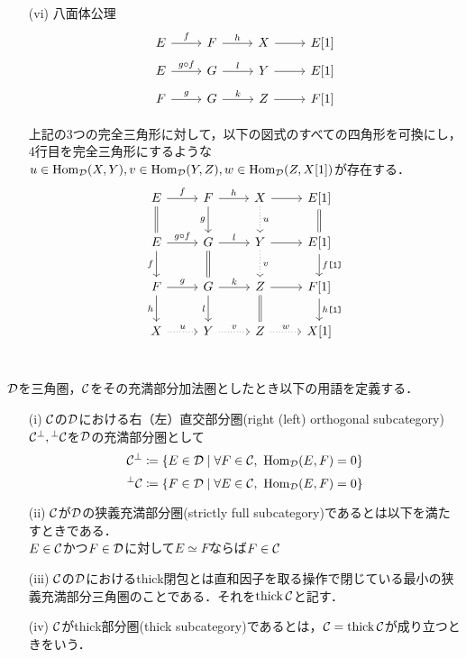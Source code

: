 \begin{defn}
\begin{itemize}
	\item[(vi)]
		八面体公理\\
			\[
				\begin{tikzcd}[row sep=5pt]
			E \ar[r,"f"]& F\ar[r,"h"]& X \ar[r]& E[1]\\
			E \ar[r,"g\circ f"]& G\ar[r,"l"]& Y \ar[r]& E[1]\\
			F \ar[r,"g"]& G\ar[r,"k"]& Z \ar[r]& F[1]\\
		\end{tikzcd}
			\]
			上記の3つの完全三角形に対して，以下の図式のすべての四角形を可換にし，4行目を完全三角形にするような$u\in\operatorname{\mathrm{Hom}}_{{\mathcal D}}(X,Y),v\in\operatorname{\mathrm{Hom}}_{{\mathcal D}}(Y,Z),w\in\operatorname{\mathrm{Hom}}_{{\mathcal D}}(Z,X[1])$が存在する．
			\[
		\begin{tikzcd}
			E \ar[r,"f"]\ar[d,equal]& F\ar[r,"h"]\ar[d,"g",swap]& X\ar[d,"u",dotted] \ar[r]& E[1]\ar[d,equal]\\
			E \ar[r,"g\circ f"]\ar[d,"f",swap]& G\ar[r,"l"]\ar[d,equal]& Y\ar[d,"v",dotted] \ar[r]& E[1]\ar[d,"f\texttt{[1]}"]\\
			F \ar[r,"g"]\ar[d,"h",swap]& G\ar[r,"k"]\ar[d,"l",swap]& Z \ar[r]\ar[d,equal]& F[1]\ar[d,"h\texttt{[1]}"]\\
			X \ar[r,"u",dotted]& Y\ar[r,"v",dotted]& Z \ar[r,"w",dotted]& X[1]\\
		\end{tikzcd}
			\]
	\end{itemize}
\end{defn}

\begin{defn}
	${\mathcal D}$を三角圏，${\mathcal C}$をその充満部分加法圏としたとき以下の用語を定義する．
	\begin{itemize}
		\item[(i)]
			${\mathcal C}$の${\mathcal D}$における右（左）直交部分圏(right (left) orthogonal subcategory)${\mathcal C}^\perp,{}^\perp{\mathcal C}$を${\mathcal D}$の充満部分圏として
			\[\C^\perp\coloneq \{E\in\D\mid\forall F\in\C,\ \Hom_{\D}(E,F)=0\}\]
			\[{}^\perp\C\coloneq \{F\in\D\mid\forall E\in\C,\ \Hom_{\D}(E,F)=0\}\]
		\item[(ii)]
			${\mathcal C}$が${\mathcal D}$の狭義充満部分圏(strictly full subcategory)であるとは以下を満たすときである．\\
			$E\in{\mathcal C}$かつ$F\in{\mathcal D}$に対して$E\simeq F$ならば$F\in{\mathcal C}$
		\item[(iii)]
			${\mathcal C}$の${\mathcal D}$におけるthick閉包とは直和因子を取る操作で閉じている最小の狭義充満部分三角圏のことである．それを$\operatorname{\mathrm{thick}} {\mathcal C}$と記す．
		\item[(iv)]
			${\mathcal C}$がthick部分圏(thick subcategory)であるとは，${\mathcal C} = \operatorname{\mathrm{thick}}{\mathcal C}$が成り立つときをいう．
	\end{itemize}
\end{defn}

